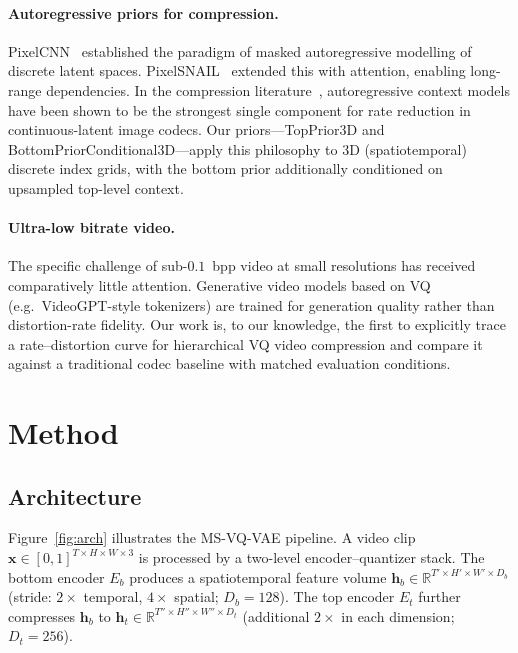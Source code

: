 \documentclass{article}
\newcommand{\model}{\textsc{MS-VQ-VAE}}
\begin{document}
\paragraph{Autoregressive priors for compression.}
PixelCNN~\cite{pixelcnn} established the paradigm of masked autoregressive
modelling of discrete latent spaces.
PixelSNAIL~\cite{pixelsnail} extended this with attention, enabling
long-range dependencies.
In the compression literature~\cite{minnen2018joint}, autoregressive context
models have been shown to be the strongest single component for
rate reduction in continuous-latent image codecs.
Our priors---TopPrior3D and BottomPriorConditional3D---apply this philosophy
to 3D (spatiotemporal) discrete index grids, with the bottom prior
additionally conditioned on upsampled top-level context.

\paragraph{Ultra-low bitrate video.}
The specific challenge of sub-$0.1$~bpp video at small resolutions has
received comparatively little attention.
Generative video models based on VQ (e.g.\ VideoGPT-style tokenizers) are
trained for generation quality rather than distortion-rate fidelity.
Our work is, to our knowledge, the first to explicitly trace a rate--distortion
curve for hierarchical VQ video compression and compare it against a
traditional codec baseline with matched evaluation conditions.

\section{Method}
\label{sec:method}

\subsection{Architecture}
\label{sec:arch}

Figure~\ref{fig:arch} illustrates the \model{} pipeline.
A video clip $\mathbf{x} \in [0,1]^{T\times H\times W\times 3}$ is
processed by a two-level encoder--quantizer stack.
The bottom encoder $E_b$ produces a spatiotemporal feature volume
$\mathbf{h}_b \in \mathbb{R}^{T'\times H'\times W'\times D_b}$
(stride: $2\times$ temporal, $4\times$ spatial; $D_b=128$).
The top encoder $E_t$ further compresses $\mathbf{h}_b$ to
$\mathbf{h}_t \in \mathbb{R}^{T''\times H''\times W''\times D_t}$
(additional $2\times$ in each dimension; $D_t=256$).
\end{document}
